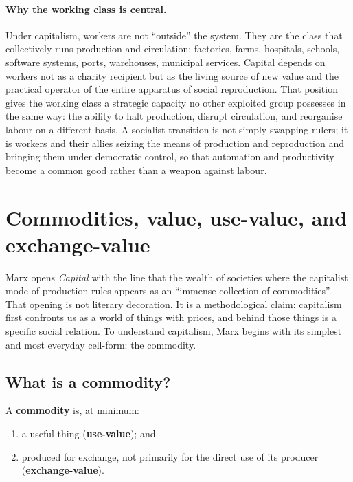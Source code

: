 \paragraph{Why the working class is central.}
Under capitalism, workers are not ``outside'' the system. They are the class that collectively runs production and circulation: factories, farms, hospitals,
schools, software systems, ports, warehouses, municipal services. Capital depends on workers not as a charity recipient but as the living source of new value
and the practical operator of the entire apparatus of social reproduction.\cite{Marx1867,MarxEngels1848}
That position gives the working class a strategic capacity no other exploited group possesses in the same way: the ability to halt production, disrupt circulation,
and reorganise labour on a different basis. A socialist transition is not simply swapping rulers; it is workers and their allies seizing the means of production and
reproduction and bringing them under democratic control, so that automation and productivity become a common good rather than a weapon against labour.

\section{Commodities, value, use-value, and exchange-value}
\label{sec:commodities}

Marx opens \emph{Capital} with the line that the wealth of societies where the capitalist mode of production
rules appears as an ``immense collection of commodities''.\cite{Marx1867} That opening is not literary
decoration. It is a methodological claim: capitalism first confronts us as a world of things with prices,
and behind those things is a specific social relation. To understand capitalism, Marx begins with its
simplest and most everyday cell-form: the commodity.

\subsection{What is a commodity?}
\label{sec:what-is-a-commodity}

A \textbf{commodity} is, at minimum:

\begin{enumerate}[leftmargin=1.5em]
  \item a useful thing (\textbf{use-value}); and
  \item produced for exchange, not primarily for the direct use of its producer (\textbf{exchange-value}).
\end{enumerate}

